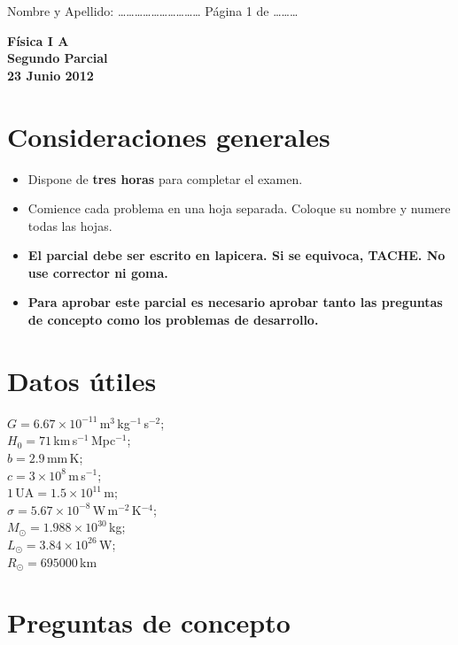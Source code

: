 \documentclass[a4paper,12pt]{article}
\begin{document}
\pagestyle{empty}
Nombre y Apellido: \ldots\ldots\ldots\ldots\ldots\ldots\ldots\ldots\ldots\ldots
Página 1 de \ldots\ldots\ldots \begin{center}
{\Large {\bf{Física I A}}} \\
\bigskip
{\large {\bf{Segundo Parcial}}} \\ {\bf{23 Junio 2012}} \\
\end{center}

\section*{Consideraciones generales}

\begin{itemize}
\item Dispone de {\bf{tres horas}} para completar el examen.
\item Comience cada problema en una hoja separada. Coloque su nombre y
numere todas las hojas.
\item {\bf{El parcial debe ser escrito en lapicera. Si se equivoca, TACHE. No use corrector ni goma.}}
\item {\bf{Para aprobar este parcial es necesario aprobar tanto las
preguntas de concepto como los problemas de desarrollo.}}
\end{itemize}

\section*{Datos útiles}
 
\indent $G = 6.67 \times 10^{-11}$\,m$^3$\,kg$^{-1}$\,s$^{-2}$;\\
\indent $H_0 = 71 $\,km\,s$^{-1}$\,Mpc$^{-1}$;\\
\indent $b = 2.9 $\,mm\,K;\\
\indent $c = 3 \times 10^{8}$\,m\,s$^{-1}$;\\
\indent $1\mathrm{\,UA} = 1.5 \times 10^{11}$\,m;\\
\indent $\sigma = 5.67 \times 10^{-8}$\,W\,m$^{-2}$\,K$^{-4}$;\\
\indent $M_\odot = 1.988\times10^{30}$\,kg;\\
\indent $L_\odot = 3.84\times10^{26}$\,W;\\
\indent $R_\odot=695000$\,km


\section*{Preguntas de concepto}
\end{document}
